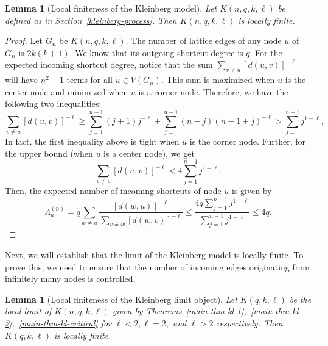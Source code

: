 \documentclass[10pt]{amsart}
\newtheorem{lemma}[theorem]{Lemma}
\begin{document}
\begin{lemma}[Local finiteness of the Kleinberg model] \label{prelim-2} Let $K(n,q,k,\ell)$  be defined as in Section~\ref{kleinberg-process}. Then
$K(n,q,k,\ell)$ is locally finite. 
\end{lemma}
\begin{proof}

Let $G_n$ be $K(n,q,k,\ell)$. The number of lattice edges of any node $u$ of $G_n$ is $2k(k+1)$. We know that its outgoing shortcut degree is $q$. For the expected incoming shortcut degree, notice that the sum $\sum_{v \neq u} [d(u, v)]^{-\ell}$ will have $n^2 -1$ terms for all $u \in V(G_n)$. This sum is maximized when $u$ is the center node and minimized when $u$ is a corner node. Therefore, we have the following two inequalities:
\begin{equation} \label{corner}
    \sum_{v \neq u} [d(u, v)]^{-\ell} \geq \sum_{j=1}^{n-1} (j+1) j^{-\ell} + \sum_{j=1}^{n-1} (n-j) (n-1+j)^{-\ell} > \sum_{j=1}^{n-1} j^{1-\ell},
\end{equation}
In fact, the first inequality above is tight when $u$ is the corner node. Further, for the upper bound (when $u$ is a center node), we get
\begin{equation} \label{center}
   \sum_{v \neq u} [d(u, v)]^{-\ell} < 4\sum_{j=1}^{n-1} j^{1-\ell}.
\end{equation}
Then, the expected number of incoming shortcuts of node $u$ is given by
$$\Lambda_{u}^{(n)} = q \sum_{w\neq u} \frac{[d(w, u)]^{-\ell}}{\sum_{v \neq w} [d(w, v)]^{-\ell}} \leq \frac{4q \sum_{j=1}^{n-1} j^{1-\ell}}{\sum_{j=1}^{n-1} j^{1-\ell}} \leq 4q.$$
\end{proof}

Next, we will establish that the limit of the Kleinberg model is locally finite. 
To prove this, we need to ensure that the number of incoming edges originating from infinitely many nodes is controlled.

\begin{lemma}[Local finiteness of the Kleinberg limit object]\label{prelim-3} Let $K(q,k,\ell)$ be the local limit of $K(n, q,k,\ell)$ given by Theorems~\ref{main-thm-kl-1},~\ref{main-thm-kl-2},~\ref{main-thm-kl-critical} for $\ell<2, \ell=2,$ and $\ell >2$ respectively. Then
$K(q,k,\ell)$ is locally finite. 
\end{lemma}
\end{document}
